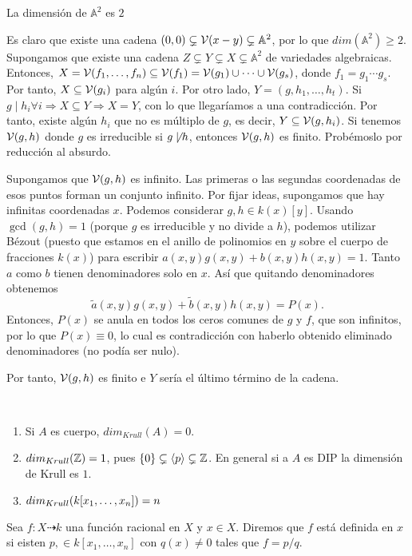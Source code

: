 \documentclass[ACGA.tex]{subfiles}
\begin{document}
\begin{prop}
La dimensión de $\mathbb{A}^2$ es $2$
\end{prop}
\begin{dem}
Es claro que existe una cadena ${(0,0)}\subsetneq\mathcal{V}(x-y)\subsetneq\mathbb{A}^2$, por lo que $dim(\mathbb{A}^2)\geq 2$. Supongamos que existe una cadena $Z\subsetneq Y\subsetneq X\subsetneq\mathbb{A}^2$ de variedades algebraicas. Entonces, $X=\mathcal{V}(f_1,\dots,f_n)\subseteq\mathcal{V}(f_1)=\mathcal{V}(g_1)\cup\cdots\cup\mathcal{V}(g_s)$, donde $f_1=g_1\cdots g_s$. Por tanto, $X\subseteq\mathcal{V}(g_i)$ para algún $i$. Por otro lado, $Y=(g, h_1,\dots,h_t)$. Si $g\mid h_i\forall i\Rightarrow X\subseteq Y\Rightarrow X=Y$, con lo que llegaríamos a una contradicción. Por tanto, existe algún $h_i$ que no es múltiplo de $g$, es decir, $Y\subseteq\mathcal{V}(g,h_i)$. Si tenemos $\mathcal{V}(g,h)$ donde $g$ es irreducible si $g\not\mid h$, entonces $\mathcal{V}(g,h)$ es finito. Probémoslo por reducción al absurdo.

Supongamos que $\mathcal{V}(g,h)$ es infinito. Las primeras o las segundas coordenadas de esos puntos forman un conjunto infinito. Por fijar ideas, supongamos que hay infinitas coordenadas $x$. Podemos considerar $g,h\in k(x)[y]$. Usando $\gcd(g,h)=1$ (porque $g$ es irreducible y no divide a $h$), podemos utilizar Bézout (puesto que estamos en el anillo de polinomios en $y$ sobre el cuerpo de fracciones $k(x)$) para escribir $a(x,y)g(x,y)+b(x,y)h(x,y)=1$. Tanto $a$ como $b$ tienen denominadores solo en $x$.  Así que quitando denominadores obtenemos 
$$\tilde{a}(x,y)g(x,y)+\tilde{b}(x,y)h(x,y)=P(x).$$
Entonces, $P(x)$ se anula en todos los ceros comunes de $g$ y $f$, que son infinitos, por lo que $P(x)\equiv 0$, lo cual es contradicción con haberlo obtenido eliminado denominadores (no podía ser nulo). 

Por tanto, $\mathcal{V}(g,h)$ es finito e $Y$ sería el último término de la cadena. 
\end{dem}

\begin{ej}\
\begin{enumerate}
\item Si $A$ es cuerpo, $dim_{Krull}(A)=0$.
\item $dim_{Krull}(\mathbb{Z})=1$, pues $\{0\}\subsetneq\langle p\rangle\subsetneq\mathbb{Z}$. En general si a $A$ es DIP la dimensión de Krull es $1$.
\item $dim_{Krull}(k[x_1,\dotsc,x_{n}])=n$
\end{enumerate}
\end{ej}

\begin{defi} Sea $f : X \dashrightarrow k$ una función racional en $X$ y $x \in X$. Diremos que $f$ está definida en $x$ si eisten $p, \in k[x_1,\dots,x_n]$ con $q(x)\neq 0$ tales que $f = p/q$.
\end{defi}
\end{document}
